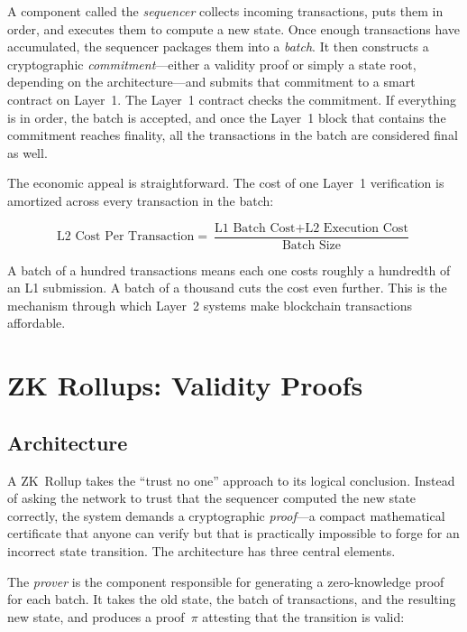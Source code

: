 A component called the \textit{sequencer} collects incoming transactions, puts them in order, and executes them to compute a new state. Once enough transactions have accumulated, the sequencer packages them into a \textit{batch}. It then constructs a cryptographic \textit{commitment}---either a validity proof or simply a state root, depending on the architecture---and submits that commitment to a smart contract on Layer~1. The Layer~1 contract checks the commitment. If everything is in order, the batch is accepted, and once the Layer~1 block that contains the commitment reaches finality, all the transactions in the batch are considered final as well.

The economic appeal is straightforward. The cost of one Layer~1 verification is amortized across every transaction in the batch:

\begin{equation}
\text{L2 Cost Per Transaction} = \frac{\text{L1 Batch Cost} + \text{L2 Execution Cost}}{\text{Batch Size}}
\end{equation}

\noindent A batch of a hundred transactions means each one costs roughly a hundredth of an L1 submission. A batch of a thousand cuts the cost even further. This is the mechanism through which Layer~2 systems make blockchain transactions affordable.

\section{ZK Rollups: Validity Proofs}

\subsection{Architecture}

A ZK~Rollup takes the ``trust no one'' approach to its logical conclusion. Instead of asking the network to trust that the sequencer computed the new state correctly, the system demands a cryptographic \textit{proof}---a compact mathematical certificate that anyone can verify but that is practically impossible to forge for an incorrect state transition. The architecture has three central elements.

The \textit{prover} is the component responsible for generating a zero-knowledge proof for each batch. It takes the old state, the batch of transactions, and the resulting new state, and produces a proof~$\pi$ attesting that the transition is valid:

